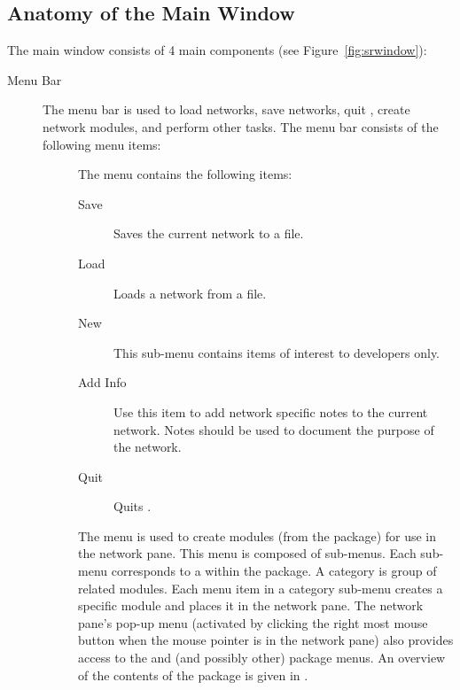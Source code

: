 \subsection{Anatomy of the Main Window}
\label{sec:windowanatomy}

The \sr{} main window consists of 4 main components (see
Figure~\ref{fig:srwindow}): 

\begin{description}
\item[Menu Bar] The menu bar is used to load networks, save networks, quit
  \sr, create network modules, and perform other tasks.  The menu bar
  consists of the following menu items:

  \begin{description}
  \item[] The  menu contains the following items:
    \begin{description}
    \item[Save] Saves the current network to a file.
    \item[Load] Loads a network from a file.
    \item[New] This sub-menu contains items of interest to developers only.
    \item[Add Info] Use this item to add network specific notes to
      the current network.  Notes should be used to document the purpose of
      the network.
    \item[Quit] Quits \sr.
    \end{description}
  \end{description}
  
  \begin{description}
  \item[] The  menu is used to create modules
    (from the \sr{} package) for use in the network pane.  This menu is
    composed of sub-menus. Each sub-menu corresponds to a 
     within the \sr{} package.  A category is group of
    related modules.  Each menu item in a category sub-menu creates a
    specific module and places it in the network pane.  The network pane's
    pop-up menu (activated by clicking the right most mouse button when the
    mouse pointer is in the network pane) also provides access to the
    \menu{\sr{}} and \menu{\pse{}} (and possibly other) package menus.  An
    overview of the contents of the \sr{} package is given in .
  \end{description}


\end{description}
